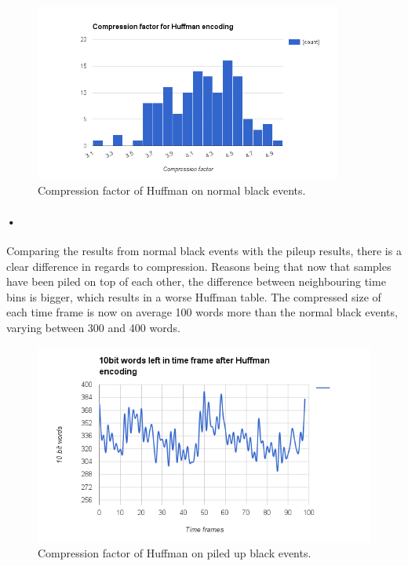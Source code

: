 \documentclass[a4paper, 12pt, openright, twoside]{report}
\begin{document}
\begin{figure}[h!]
	\centering
		\includegraphics[width=0.9\textwidth]{images/compression-factor-huffman.png}
		\caption{Compression factor of Huffman on normal black events.}
		\label{fig:compression-factor-huffman}
\end{figure}

\paragraph{•}
Comparing the results from normal black events with the pileup results, there is a clear difference in regards to compression.
Reasons being that now that samples have been piled on top of each other, the difference between neighbouring time bins is bigger, which results in a worse Huffman table.
The compressed size of each time frame is now on average 100 words more than the normal black events, varying between 300 and 400 words.

\begin{figure}[h!]
	\centering
		\includegraphics[width=1.0\textwidth]{images/blackevents-pileup-huffman.png}
		\caption{Compression factor of Huffman on piled up black events.}
		\label{fig:blackevents-huffman-pileup}
\end{figure}
\end{document}
